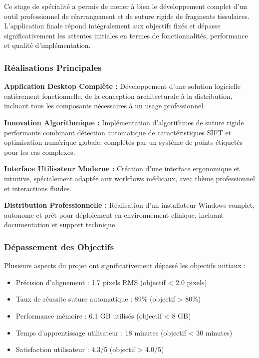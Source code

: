 \documentclass[12pt,a4paper]{article}
\begin{document}
Ce stage de spécialité a permis de mener à bien le développement complet d'un outil professionnel de réarrangement et de suture rigide de fragments tissulaires. L'application finale répond intégralement aux objectifs fixés et dépasse significativement les attentes initiales en termes de fonctionnalités, performance et qualité d'implémentation.

\subsubsection{Réalisations Principales}

\textbf{Application Desktop Complète :} Développement d'une solution logicielle entièrement fonctionnelle, de la conception architecturale à la distribution, incluant tous les composants nécessaires à un usage professionnel.

\textbf{Innovation Algorithmique :} Implémentation d'algorithmes de suture rigide performants combinant détection automatique de caractéristiques SIFT et optimisation numérique globale, complétés par un système de points étiquetés pour les cas complexes.

\textbf{Interface Utilisateur Moderne :} Création d'une interface ergonomique et intuitive, spécialement adaptée aux workflows médicaux, avec thème professionnel et interactions fluides.

\textbf{Distribution Professionnelle :} Réalisation d'un installateur Windows complet, autonome et prêt pour déploiement en environnement clinique, incluant documentation et support technique.

\subsubsection{Dépassement des Objectifs}

Plusieurs aspects du projet ont significativement dépassé les objectifs initiaux :
\begin{itemize}
\item Précision d'alignement : 1.7 pixels RMS (objectif < 2.0 pixels)
\item Taux de réussite suture automatique : 89\% (objectif > 80\%)
\item Performance mémoire : 6.1 GB utilisés (objectif < 8 GB)
\item Temps d'apprentissage utilisateur : 18 minutes (objectif < 30 minutes)
\item Satisfaction utilisateur : 4.3/5 (objectif > 4.0/5)
\end{itemize}
\end{document}
